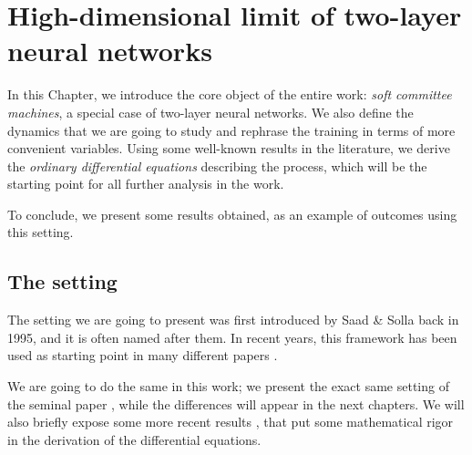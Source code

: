 \chapter{High-dimensional limit of two-layer neural networks} \label{chap:context}

In this Chapter, we introduce the core object of the entire work: \emph{soft committee machines},
a special case of two-layer neural networks.
We also define the dynamics that we are going to study and rephrase the training in terms
of more convenient variables. Using some well-known results in the literature, we derive the 
\emph{ordinary differential equations} describing the process, which will be the starting point 
for all further analysis in the work.

To conclude, we present some results obtained, as an example of 
outcomes using this setting. %

\section{The setting}
The setting we are going to present was first introduced by Saad \& Solla \cite{saad1995line}
back in 1995,
and it is often named after them.
In recent years, this framework has been used as starting point in many different papers
\cite{aubin2018committee, goldt2019dynamics,veiga2022phase}.

We are going to do the same in this work; we present the exact same setting of the seminal paper \cite{saad1995line}, while the differences
will appear in the next chapters. We will also briefly expose some more recent results \cite{goldt2019dynamics},
that put some mathematical rigor in the derivation of the differential equations.

